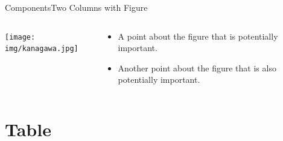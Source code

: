 \documentclass[aspectratio=169,t]{beamer}
\begin{document}
\begin{frame}{Components}{Two Columns with Figure}
  \begin{columns}[T]
    \vspace{0pt}
    \begin{column}{.6\textwidth}
        \texttt{[image: img/kanagawa.jpg]}
    \end{column}
    \hfill
    \begin{column}{.4\textwidth}
        \begin{itemize}
            \item A point about the figure that is potentially important.
            \item Another point about the figure that is also potentially important.
        \end{itemize}
    \end{column}
  \end{columns}
\end{frame}

\section{Table}
\end{document}
